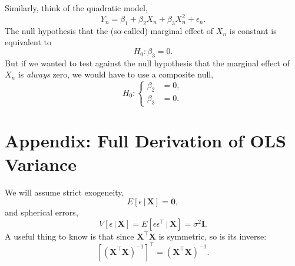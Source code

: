 \documentclass[
  12pt,
  oneside,openany]{book}
\begin{document}
Similarly, think of the quadratic model,
\[
Y_n = \beta_1 + \beta_2 X_n + \beta_3 X_n^2 + \epsilon_n.
\]
The null hypothesis that the (so-called) marginal effect of \(X_n\) is constant is equivalent to
\[
H_0 : \beta_3 = 0.
\]
But if we wanted to test against the null hypothesis that the marginal effect of \(X_n\) is \emph{always} zero, we would have to use a composite null,
\[
H_0 : \left\{ \begin{aligned}
  \beta_2 &= 0, \\
  \beta_3 &= 0.
\end{aligned} \right.
\]

\hypertarget{appendix-full-derivation-of-ols-variance}{%
\section{Appendix: Full Derivation of OLS Variance}\label{appendix-full-derivation-of-ols-variance}}

We will assume strict exogeneity,
\[
E [\epsilon \,|\, \mathbf{X}] = \mathbf{0},
\]
and spherical errors,
\[
V [\epsilon \,|\, \mathbf{X}] = E [\epsilon \epsilon^\top \,|\, \mathbf{X}] = \sigma^2 \mathbf{I}.
\]
A useful thing to know is that since \(\mathbf{X}^\top \mathbf{X}\) is symmetric, so is its inverse:
\[
[(\mathbf{X}^\top \mathbf{X})^{-1}]^\top = (\mathbf{X}^\top \mathbf{X})^{-1}.
\]
\end{document}
